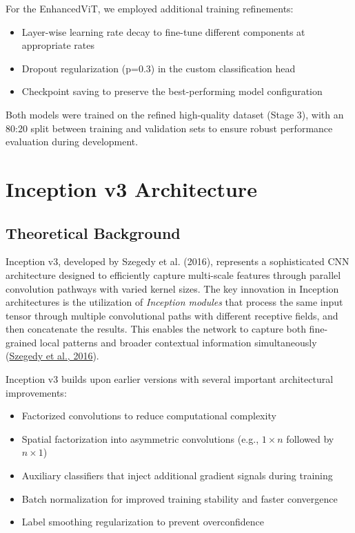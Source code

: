 \documentclass[a4paper,12pt]{article}
\begin{document}
For the EnhancedViT, we employed additional training refinements:

\begin{itemize}
    \item Layer-wise learning rate decay to fine-tune different components at appropriate rates
    \item Dropout regularization (p=0.3) in the custom classification head
    \item Checkpoint saving to preserve the best-performing model configuration
\end{itemize}

Both models were trained on the refined high-quality dataset (Stage 3), with an 80:20 split between training and validation sets to ensure robust performance evaluation during development.



\section*{Inception v3 Architecture}

\subsection*{Theoretical Background}
Inception v3, developed by Szegedy et al. (2016), represents a sophisticated CNN architecture designed to efficiently capture multi-scale features through parallel convolution pathways with varied kernel sizes. The key innovation in Inception architectures is the utilization of \textit{Inception modules} that process the same input tensor through multiple convolutional paths with different receptive fields, and then concatenate the results. This enables the network to capture both fine-grained local patterns and broader contextual information simultaneously (\href{https://arxiv.org/abs/1512.00567}{Szegedy et al., 2016}).

Inception v3 builds upon earlier versions with several important architectural improvements:
\begin{itemize}
    \item Factorized convolutions to reduce computational complexity
    \item Spatial factorization into asymmetric convolutions (e.g., $1 \times n$ followed by $n \times 1$)
    \item Auxiliary classifiers that inject additional gradient signals during training
    \item Batch normalization for improved training stability and faster convergence
    \item Label smoothing regularization to prevent overconfidence
\end{itemize}
\end{document}
